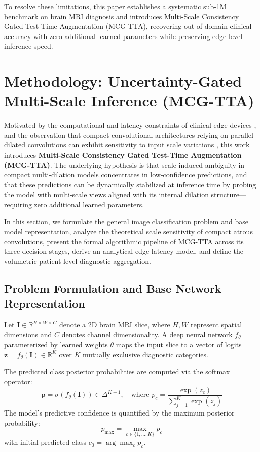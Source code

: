 ﻿\documentclass[journal]{IEEEtran}
\begin{document}
To resolve these limitations, this paper establishes a systematic sub-1M benchmark on brain MRI diagnosis and introduces Multi-Scale Consistency Gated Test-Time Augmentation (MCG-TTA), recovering out-of-domain clinical accuracy with zero additional learned parameters while preserving edge-level inference speed.


\section{Methodology: Uncertainty-Gated Multi-Scale Inference (MCG-TTA)}

Motivated by the computational and latency constraints of clinical edge devices \cite{12, 25, 26}, and the observation that compact convolutional architectures relying on parallel dilated convolutions can exhibit sensitivity to input scale variations \cite{5, 21}, this work introduces \textbf{Multi-Scale Consistency Gated Test-Time Augmentation (MCG-TTA)}. The underlying hypothesis is that scale-induced ambiguity in compact multi-dilation models concentrates in low-confidence predictions, and that these predictions can be dynamically stabilized at inference time by probing the model with multi-scale views aligned with its internal dilation structure---requiring zero additional learned parameters.

In this section, we formulate the general image classification problem and base model representation, analyze the theoretical scale sensitivity of compact atrous convolutions, present the formal algorithmic pipeline of MCG-TTA across its three decision stages, derive an analytical edge latency model, and define the volumetric patient-level diagnostic aggregation.

\subsection{Problem Formulation and Base Network Representation}

Let $\mathbf{I} \in \mathbb{R}^{H \times W \times C}$ denote a 2D brain MRI slice, where $H, W$ represent spatial dimensions and $C$ denotes channel dimensionality. A deep neural network $f_\theta$ parameterized by learned weights $\theta$ maps the input slice to a vector of logits $\mathbf{z} = f_\theta(\mathbf{I}) \in \mathbb{R}^K$ over $K$ mutually exclusive diagnostic categories. 

The predicted class posterior probabilities are computed via the softmax operator:
\begin{equation}
\mathbf{p} = \sigma\left(f_\theta(\mathbf{I})\right) \in \Delta^{K-1}, \quad \text{where } p_c = \frac{\exp(z_c)}{\sum_{j=1}^K \exp(z_j)}
\label{eq:softmax}
\end{equation}
The model's predictive confidence is quantified by the maximum posterior probability:
\begin{equation}
p_{\max} = \max_{c \in \{1, \dots, K\}} p_c
\end{equation}
with initial predicted class $c_0 = \arg\max_c p_c$.
\end{document}

